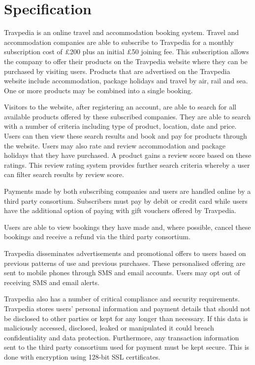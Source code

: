 \section{Specification}

Travpedia is an online travel and accommodation booking system. Travel and
accommodation companies are able to subscribe to Travpedia for a monthly
subscription cost of £200 plus an initial £50 joining fee. This subscription
allows the company to offer their products on the Travpedia website where they
can be purchased by visiting users. Products that are advertised on the
Travpedia website include accommodation, package holidays and travel by air,
rail and sea. One or more products may be combined into a single booking.

Visitors to the website, after registering an account, are able to search for
all available products offered by these subscribed companies. They are able to
search with a number of criteria including type of product, location, date and
price. Users can then view these search results and book and pay for products
through the website. Users may also rate and review accommodation and package
holidays that they have purchased. A product gains a review score based on
these ratings. This review rating system provides further search criteria
whereby a user can filter search results by review score.

Payments made by both subscribing companies and users are handled online by a
third party consortium. Subscribers must pay by debit or credit card while
users have the additional option of paying with gift vouchers offered by
Travpedia.

Users are able to view bookings they have made and, where possible, cancel
these bookings and receive a refund via the third party consortium.

Travpedia disseminates advertisements and promotional offers to users based on
previous patterns of use and previous purchases. These personalised offering
are sent to mobile phones through SMS and email accounts. Users may opt out of
receiving SMS and email alerts.

Travpedia also has a number of critical compliance and security requirements.
Travpedia stores users' personal information and payment details that should
not be disclosed to other parties or kept for any longer than necessary. If
this data is maliciously accessed, disclosed, leaked or manipulated it could
breach confidentiality and data protection. Furthermore, any transaction
information sent to the third party consortium used for payment must be kept
secure. This is done with encryption using 128-bit SSL certificates.

